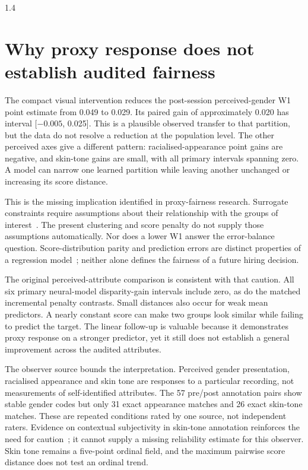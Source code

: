 \begin{spacing}{1.4}
\section{Why proxy response does not establish audited fairness}

The compact visual intervention reduces the post-session perceived-gender W1 point
estimate from 0.049 to 0.029. Its paired gain of approximately 0.020 has interval
[$-0.005$, 0.025]. This is a plausible observed transfer to that partition, but the
data do not resolve a reduction at the population level. The other perceived axes
give a different pattern: racialised-appearance point gains are negative, and skin-tone
gains are small, with all primary intervals spanning zero. A model can narrow one
learned partition while leaving another unchanged or increasing its score distance.

This is the missing implication identified in proxy-fairness research. Surrogate
constraints require assumptions about their relationship with the groups of
interest~\cite{Gupta2018ProxyFairness}. The present clustering and score penalty do not
supply those assumptions automatically. Nor does a lower W1 answer the error-balance
question. Score-distribution parity and prediction errors are distinct properties of a
regression model~\cite{Petersen2023RiskScores}; neither alone defines the fairness of a
future hiring decision.

The original perceived-attribute comparison is consistent with that caution. All six
primary neural-model disparity-gain intervals include zero, as do the matched incremental
penalty contrasts. Small distances also occur for weak mean predictors. A nearly constant
score can make two groups look similar while failing to predict the target. The linear
follow-up is valuable because it demonstrates proxy response on a stronger predictor,
yet it still does not establish a general improvement across the audited attributes.

The observer source bounds the interpretation. Perceived gender presentation, racialised
appearance and skin tone are responses to a particular recording, not measurements of
self-identified attributes. The 57 pre/post annotation pairs show stable gender codes but
only 31 exact appearance matches and 26 exact skin-tone matches. These are repeated
conditions rated by one source, not independent raters. Evidence on contextual subjectivity
in skin-tone annotation reinforces the need for caution~\cite{Barrett2023}; it cannot
supply a missing reliability estimate for this observer. Skin tone remains a five-point
ordinal field, and the maximum pairwise score distance does not test an ordinal trend.


\end{spacing}
